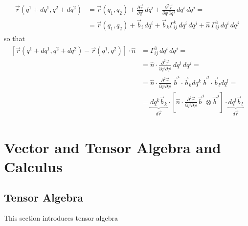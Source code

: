 \documentclass[letterpaper,10pt,english]{jupyterBook}
\begin{document}
\sphinxAtStartPar
{}
\begin{equation*}
\begin{split}\begin{aligned}
  \vec{r}(q^1 + d q^1, q^2 + d q^2) 
  & = \vec{r}(q_1, q_2) + \frac{\partial \vec{r}}{\partial q^i} \, dq^i + \frac{\partial^2 \vec{r}}{\partial q^i \partial q^j} \, dq^i \, dq^j = \\
  & = \vec{r}(q_1, q_2) + \vec{b}_{i} \, dq^i + \vec{b}_k \Gamma^{k}_{ij} \, dq^i \, dq^j +  \hat{n} \, \Gamma^{3}_{ij} \, dq^i \, dq^j 
\end{aligned}\end{split}
\end{equation*}
\sphinxAtStartPar
so that
\begin{equation*}
\begin{split}\begin{aligned}
\left[ \vec{r}(q^1 + d q^1, q^2 + d q^2) - \vec{r}(q^1, q^2) \right] \cdot \hat{n} 
 & = \Gamma^3_{ij} \, d q^i \, dq^j = \\
 & = \hat{n} \cdot \frac{\partial^2 \vec{r}}{\partial q^i \partial q^j} \, d q^i \, dq^j = \\
 & = \hat{n} \cdot \frac{\partial^2 \vec{r}}{\partial q^i \partial q^j} \, \vec{b}^i \cdot \vec{b}_k d q^k \, \vec{b}^j \cdot \vec{b}_l dq^l = \\
 & = \underbrace{d q^k \vec{b}_k}_{d \vec{r}} \cdot \left[ \hat{n} \cdot \frac{\partial^2 \vec{r}}{\partial q^i \partial q^j}  \vec{b}^i \otimes \vec{b}^j \right] \cdot \underbrace{d q^l \vec{b}_l}_{d\vec{r}}
\end{aligned}\end{split}
\end{equation*}
\sphinxAtStartPar
{}

\sphinxstepscope


\part{Vector and Tensor Algebra and Calculus}

\sphinxstepscope


\chapter{Tensor Algebra}
\label{\detokenize{ch/tensor-algebra-calculus/algebra:tensor-algebra}}\label{\detokenize{ch/tensor-algebra-calculus/algebra:id1}}\label{\detokenize{ch/tensor-algebra-calculus/algebra::doc}}
\sphinxAtStartPar
This section introduces tensor algebra
\end{document}
